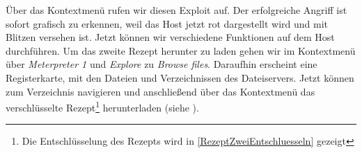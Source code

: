 
Über das Kontextmenü rufen wir diesen Exploit auf. Der erfolgreiche Angriff ist
sofort grafisch zu erkennen, weil das Host jetzt rot dargestellt wird und mit
Blitzen versehen ist. Jetzt können wir verschiedene Funktionen auf dem Host
durchführen.  Um das zweite Rezept herunter zu laden gehen wir im Kontextmenü
über \emph{Meterpreter 1} und \emph{Explore} zu \emph{\glqq{}Browse
  files\grqq{}}. Daraufhin erscheint eine Registerkarte, mit den Dateien und
Verzeichnissen des Dateiservers. Jetzt können zum Verzeichnis
 navigieren und anschließend über das Kontextmenü das
verschlüsselte Rezept\footnote{Die Entschlüsselung des Rezepts wird in
  \cref{RezeptZweiEntschluesseln} gezeigt} herunterladen (siehe
).

